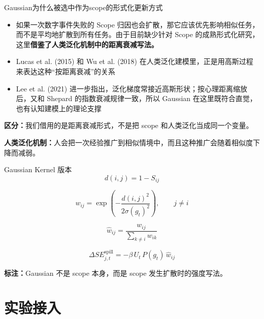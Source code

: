 \documentclass[aspectratio=169]{beamer}
\begin{document}
\begin{frame}[c]{Gaussian为什么被选中作为scope的形式化更新方式}
\small
\begin{center}
\begin{minipage}[t][0.78\textheight][t]{0.84\textwidth}
\justifying
\begin{itemize}
    \item 如果一次数字事件失败的 Scope 归因也会扩散，那它应该优先影响相似任务，而不是平均地扩散到所有任务。由于目前缺少针对 Scope 的成熟形式化研究，这里\textbf{借鉴了人类泛化机制中的距离衰减写法。}
    \item Lucas et al. (2015) 和 Wu et al. (2018) 在人类泛化建模里，正是用高斯过程来表达这种“按距离衰减”的关系
    \item Lee et al. (2021) 进一步指出，泛化梯度常接近高斯形状；按心理距离缩放后，又和 Shepard 的指数衰减规律一致，所以 Gaussian 在这里既符合直觉，也有认知建模上的理论支撑
\end{itemize}

\vspace{0.1cm}
\textbf{区分：}我们借用的是距离衰减形式，不是把 scope 和人类泛化当成同一个变量。

\vfill
{\tiny \color{black!60}\textbf{人类泛化机制：}人会把一次经验推广到相似情境中，而且这种推广会随着相似度下降而减弱。}
\end{minipage}
\end{center}
\end{frame}

\begin{frame}[t]{Gaussian Kernel 版本}
\scriptsize
\justifying
\[
d(i,j)=1-S_{ij}
\]

\[
w_{ij}=\exp\!\left(-\frac{d(i,j)^2}{2\sigma(g_t)^2}\right), \qquad j\neq i
\]

\[
\hat w_{ij}=\frac{w_{ij}}{\sum_{k\neq i} w_{ik}}
\]

\[
\Delta SE^{\text{spill}}_{j,t}
=
-\beta\, U_t\, P(g_t)\, \hat w_{ij}
\]

\vspace{0.1cm}
\raggedright
\textbf{标注：}Gaussian 不是 scope 本身，而是 scope 发生扩散时的强度写法。
\end{frame}

\section{实验接入}
\end{document}
